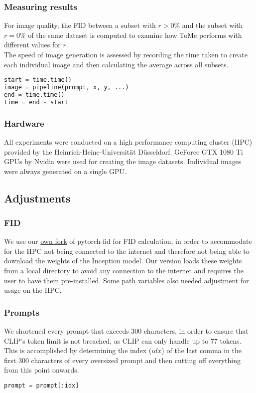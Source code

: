 \subsubsection*{Measuring results}
For image quality, the FID between a subset with \(r > 0\%\) and the subset with \(r = 0\%\) of the same dataset is computed to examine how ToMe performs with different values for \(r\).\\
The speed of image generation is assessed by recording the time taken to create each individual image and then calculating the average across all subsets.
\begin{lstlisting}[language=Python]
start = time.time()
image = pipeline(prompt, x, y, ...)
end = time.time()
time = end - start
\end{lstlisting}



\subsubsection*{Hardware}
All experiments were conducted on a high performance computing cluster (HPC) provided by the Heinrich-Heine-Universität Düsseldorf.
GeForce GTX 1080 Ti GPUs by Nvidia were used for creating the image datasets. Individual images were always generated on a single GPU.



\subsection{Adjustments}
\subsubsection*{FID}
We use our \href{https://github.com/HNR1/pytorch_fid}{own fork} of pytorch-fid \cite{Seitzer2020FID} for FID calculation, in order to accommodate for the HPC not being connected to the internet and therefore not being able to download the weights of the Inception model. Our version loads these weights from a local directory to avoid any connection to the internet and requires the user to have them pre-installed. Some path variables also needed adjustment for usage on the HPC.



\subsubsection*{Prompts}
We shortened every prompt that exceeds 300 characters, in order to ensure that CLIP's token limit is not breached, as CLIP can only handle up to 77 tokens.
This is accomplished by determining the index (\(idx\)) of the last comma in the first 300 characters of every oversized prompt and then cutting off everything from this point onwards.
\begin{lstlisting}[language=Python]
prompt = prompt[:idx]
\end{lstlisting}



